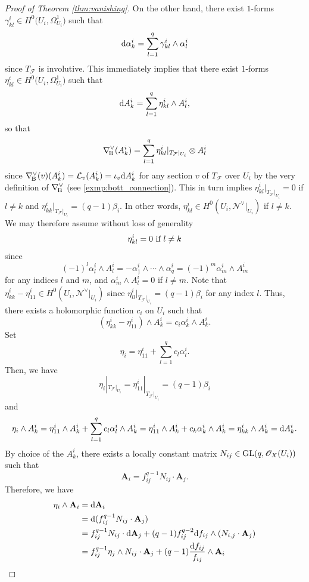 \documentclass[english,10pt]{amsart}
\newcommand{\nablaBott}{\nabla_{\! \textup{B}}}
\newcommand{\cF}{\mathcal{F}}
\newcommand{\cL}{\mathcal{L}}
\newcommand{\sN}{\mathscr{N}}
\newcommand{\sO}{\mathscr{O}}
\newcommand{\dd}{\textup{d}}
\theoremstyle{definition}
\theoremstyle{remark}
\numberwithin{equation}{section}
\begin{document}
\begin{proof}[Proof of Theorem \ref{thm:vanishing}]
On the other hand, there exist $1$-forms $\gamma_{kl}^i \in H^0\big(U_i,\Omega_{U_i}^1\big)$ such that 
\[
\dd\alpha_k^i = \sum_{l=1}^{q} \gamma_{kl}^i \wedge \alpha_l^i
\]
since $T_\cF$ is involutive. This immediately implies that there exist $1$-forms $\eta_{kl}^i \in H^0\big(U_i,\Omega_{U_i}^1\big)$ such that
\[
\dd A_k^i = \sum_{l=1}^{q} \eta_{kl}^i \wedge A_l^i,
\]
so that
\[
\nablaBott^\vee(A_k^i) = \sum_{l=1}^{q} \eta_{kl}^i|_{T_{\cF}|_{U_i}} \otimes A_l^i
\]
since $\nablaBott^\vee(v)(A_k^i)=\cL_v(A_k^i)=\iota_v \dd A_k^i$ for any section $v$ of $T_\cF$ over $U_i$
by the very definition of $\nablaBott^\vee$ (see \ref{exmp:bott_connection}). This in turn implies $\eta_{kl}^i|_{T_{\cF}|_{U_i}}=0$ if $l \neq k$ and $\eta_{kk}^i|_{T_{\cF}|_{U_i}}=(q-1)\beta_i$. In other words, $\eta_{kl}^i \in H^0(U_i,\sN^\vee|_{U_i})$ if $l \neq k$. We may therefore assume without loss of generality
\[
\eta_{kl}^i=0 \textup{ if } l\neq k
\] 
since 
\[
(-1)^{l} \alpha_l^i\wedge A_l^i = - \alpha_1^i\wedge\cdots \wedge \alpha_q^i= (-1)^{m} \alpha_m^i\wedge A_m^i
\]
for any indices $l$ and $m$, and $\alpha_m^i\wedge A_l^i=0$ if $l\neq m$. Note that $\eta_{kk}^i-\eta_{11}^i \in H^0(U_i,\sN^\vee|_{U_i})$ since $\eta_{ll}^i|_{T_{\cF}|_{U_i}}=(q-1)\beta_i$ for any index $l$. Thus, there exists a holomorphic function $c_i$ on $U_i$ such that 
\[
(\eta_{kk}^i-\eta_{11}^i)\wedge A_k^i=c_i \alpha_k^i \wedge A_k^i.
\]
Set 
\[
\eta_i=\eta_{11}^i+\sum_{l=1}^q c_l \alpha_l^i. 
\]
Then, we have
\begin{equation}\label{eq:eta}
\eta_i|_{T_{\cF}|_{U_i}}=\eta_{11}^i|_{T_{\cF}|_{U_i}}=(q-1)\beta_i
\end{equation}
and
\[
\eta_i \wedge A_k^i = \eta_{11}^i \wedge A_k^i + \sum_{l=1}^q c_l \alpha_l^i \wedge A_k^i = \eta_{11}^i \wedge A_k^i + c_k\alpha_k^i \wedge A_k^i = \eta_{kk}^i \wedge A_k^i = \dd A_k^i.
\]
By choice of the $A_k^i$, there exists a locally constant matrix $N_{ij} \in \textup{GL}(q,\sO_X(U_i))$ such that 
\[
\textbf{A}_i= f_{ij}^{q-1} N_{ij} \cdot \textbf{A}_j.
\]
Therefore, we have
\begin{align*}
\eta_i \wedge \textbf{A}_i & =  \dd \textbf{A}_i \\
& = \dd (f_{ij}^{q-1} N_{ij} \cdot \textbf{A}_j) \\
& =  f_{ij}^{q-1} N_{ij} \cdot \dd \textbf{A}_j + (q-1) f_{ij}^{q-2} \dd f_{ij} \wedge (N_{i,j} \cdot \textbf{A}_j) \\
& =  f_{ij}^{q-1} \eta_j \wedge N_{ij} \cdot \textbf{A}_j + (q-1)\frac{\dd f_{ij}}{f_{ij}} \wedge \textbf{A}_i\\

\end{align*}
\end{proof}
\end{document}

